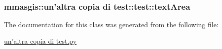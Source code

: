 \label{classmmasgis_1_1un'altra_01copia_01di_01test_1_1test_a7154c9cbc479067988dac448fe3620c5}
\hypertarget{classmmasgis_1_1un'altra_01copia_01di_01test_1_1test_a8786258257e305bc607f36b9db7d1492}{
\subsubsection[{textArea}]{\setlength{\rightskip}{0pt plus 5cm}mmasgis::un'altra copia di test::test::textArea}}
\label{classmmasgis_1_1un'altra_01copia_01di_01test_1_1test_a8786258257e305bc607f36b9db7d1492}


The documentation for this class was generated from the following file:\begin{DoxyCompactItemize}
\item 
\hyperlink{un'altra_01copia_01di_01test_8py}{un'altra copia di test.py}\end{DoxyCompactItemize}
